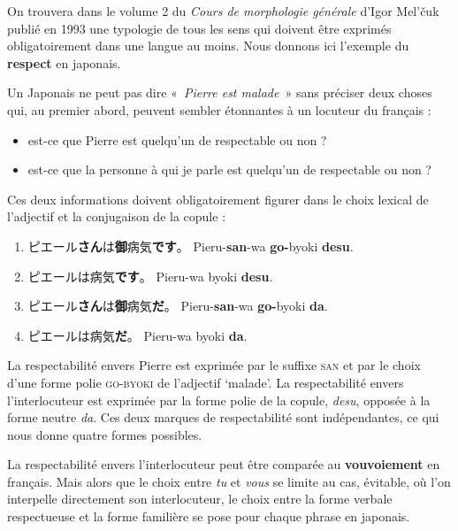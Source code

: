 {    On trouvera dans le volume 2 du \textit{Cours de morphologie générale} d’Igor Mel’čuk publié en 1993 une typologie de tous les sens qui doivent être exprimés obligatoirement dans une langue au moins. Nous donnons ici l’exemple du \textbf{respect} en japonais.

    Un Japonais ne peut pas dire «~\textit{Pierre est malade~}» sans préciser deux choses qui, au premier abord, peuvent sembler étonnantes à un locuteur du français :

    \begin{itemize}
    \item  est-ce que Pierre est quelqu’un de respectable ou non ?
    \item  est-ce que la personne à qui je parle est quelqu’un de respectable ou non ?
    \end{itemize}

    Ces deux informations doivent obligatoirement figurer dans le choix lexical de l’adjectif et la conjugaison de la copule :

    \begin{enumerate}
    \item  {\cjkfont ピエール\textbf{さん}は\textbf{御}病気\textbf{です}。}  Pieru-\textbf{san}{}-wa \textbf{go-}byoki \textbf{desu}.
    \item  {\cjkfont ピエールは病気\textbf{です}。}    Pieru-wa byoki \textbf{desu}.
    \item  {\cjkfont ピエール\textbf{さん}は\textbf{御}病気\textbf{だ}。} Pieru-\textbf{san}{}-wa \textbf{go-}byoki \textbf{da}.
    \item  {\cjkfont ピエールは病気\textbf{だ}。} Pieru-wa byoki \textbf{da}.
    \end{enumerate}

    La respectabilité envers Pierre est exprimée par le suffixe \textsc{san} et par le choix d’une forme polie \textsc{go-byoki} de l’adjectif ‘malade’. La respectabilité envers l’interlocuteur est exprimée par la forme polie de la copule, \textit{desu}, opposée à la forme neutre \textit{da}. Ces deux marques de respectabilité sont indépendantes, ce qui nous donne quatre formes possibles.

    La respectabilité envers l’interlocuteur peut être comparée au \textbf{vouvoiement} en français. Mais alors que le choix entre \textit{tu} et \textit{vous} se limite au cas, évitable, où l’on interpelle directement son interlocuteur, le choix entre la forme verbale respectueuse et la forme familière se pose pour chaque phrase en japonais.
}

